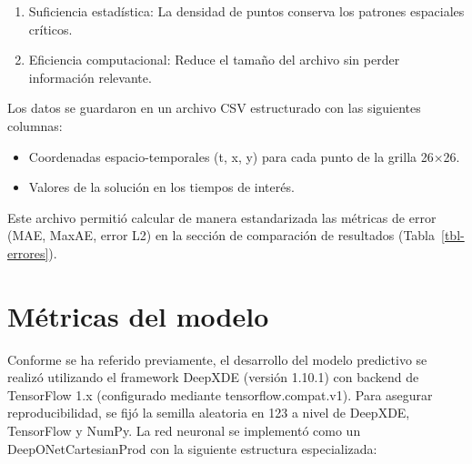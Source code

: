 \documentclass[
  spanish,
  us-letterpaper,
]{scrreprt}
\providecommand{\tightlist}{%
  \setlength{\itemsep}{0pt}\setlength{\parskip}{0pt}}
\theoremstyle{plain}
\theoremstyle{definition}
\theoremstyle{remark}
\begin{document}
\begin{enumerate}
\def\labelenumi{\arabic{enumi}.}
\tightlist
\item
  Suficiencia estadística: La densidad de puntos conserva los patrones
  espaciales críticos.
\item
  Eficiencia computacional: Reduce el tamaño del archivo sin perder
  información relevante.
\end{enumerate}

Los datos se guardaron en un archivo CSV estructurado con las siguientes
columnas:

\begin{itemize}
\tightlist
\item
  Coordenadas espacio-temporales (t, x, y) para cada punto de la grilla
  26×26.
\item
  Valores de la solución en los tiempos de interés.
\end{itemize}

Este archivo permitió calcular de manera estandarizada las métricas de
error (MAE, MaxAE, error L2) en la sección de comparación de resultados
(Tabla~\ref{tbl-errores}).

\chapter{Métricas del modelo}\label{muxe9tricas-del-modelo}

Conforme se ha referido previamente, el desarrollo del modelo predictivo
se realizó utilizando el framework DeepXDE (versión 1.10.1) con backend
de TensorFlow 1.x (configurado mediante tensorflow.compat.v1). Para
asegurar reproducibilidad, se fijó la semilla aleatoria en 123 a nivel
de DeepXDE, TensorFlow y NumPy. La red neuronal se implementó como un
DeepONetCartesianProd con la siguiente estructura especializada:
\end{document}
